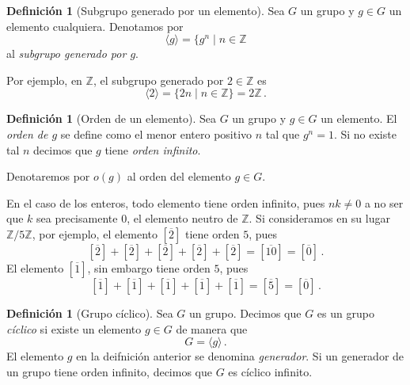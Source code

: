 \documentclass[a4paper,11pt]{amsart}
\theoremstyle{plain}
\theoremstyle{definition}
\newtheorem{defi}[thm]{Definición}
\theoremstyle{remark}
\begin{document}
\begin{defi}[Subgrupo generado por un elemento]
Sea $G$ un grupo y $g \in G$ un elemento cualquiera. Denotamos por 
\[ \langle g \rangle = \{ g^n \mid n \in \mathbb{Z} \]
al \textit{subgrupo generado por $g$}.
\end{defi}


Por ejemplo, en $\mathbb{Z}$, el subgrupo generado por $2 \in \mathbb{Z}$ es 
\[ \langle 2 \rangle = \{ 2n \mid n \in \mathbb{Z}\} = 2\mathbb{Z} \, .\]

\begin{defi}[Orden de un elemento]
Sea $G$ un grupo y $g \in G$ un elemento. El \textit{orden de $g$} se define como el menor entero positivo $n$ tal que $g^n = 1$. Si no existe tal $n$ decimos que $g$ tiene \textit{orden infinito}. 

Denotaremos por $o(g)$ al orden del elemento $g \in G$.
\end{defi}

En el caso de los enteros, todo elemento tiene orden infinito, pues $n k \neq 0$ a no ser que $k$ sea precisamente $0$, el elemento neutro de $\mathbb{Z}$. Si consideramos en su lugar $\mathbb{Z}/5\mathbb{Z}$, por ejemplo, el elemento $[\overline{2}]$ tiene orden $5$, pues 
\[ [\overline{2}] + [\overline{2}] + [\overline{2}] + [\overline{2}] + [\overline{2}] = [\overline{10}] = [\overline{0}] \, . \]
El elemento $[\overline{1}]$, sin embargo tiene orden $5$, pues 
\[ [\overline{1}] + [\overline{1}] +[\overline{1}] +[\overline{1}]+[\overline{1}] = [\overline{5}] = [\overline{0}] \, . \]

\begin{defi}[Grupo cíclico]
Sea $G$ un grupo. Decimos que $G$ es un grupo \textit{cíclico} si existe un elemento $g \in G$ de manera que 
\[ G = \langle g \rangle \, .\]
El elemento $g$ en la deifnición anterior se denomina \textit{generador}. Si un generador de un grupo tiene orden infinito, decimos que $G$ es cíclico infinito.
\end{defi}
\end{document}
